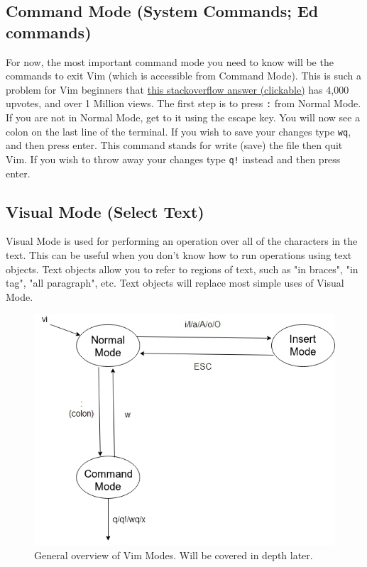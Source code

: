 \documentclass[11pt]{article}
\begin{document}
\subsection{Command Mode (System Commands; Ed commands)}
\label{sec:org34cf823}
For now, the most important command mode you need to know will be the commands
to exit Vim (which is accessible from Command Mode). This is such a problem for
Vim beginners that \href{https://stackoverflow.com/questions/11828270/how-to-exit-the-vim-editor}{this stackoverflow answer (clickable)} has 4,000 upvotes, and
over 1 Million views. The first step is to press \texttt{:} from Normal Mode. If you
are not in Normal Mode, get to it using the escape key. You will now see a colon
on the last line of the terminal. If you wish to save your changes type \texttt{wq},
and then press enter. This command stands for write (save) the file then quit
Vim. If you wish to throw away your changes type \texttt{q!} instead and then press enter.
\subsection{Visual Mode (Select Text)}
\label{sec:org6218100}
Visual Mode is used for performing an operation over all of the characters in
the text. This can be useful when you don't know how to run operations using
text objects. Text objects allow you to refer to regions of text, such as "in
braces", "in tag", "all paragraph", etc. Text objects will replace most simple
uses of Visual Mode.

\begin{figure}[htbp]
\centering
\includegraphics[width=.9\linewidth]{./modes.jpg}
\caption{\label{fig:orgffea7b4}
General overview of Vim Modes. Will be covered in depth later.}
\end{figure}
\end{document}

